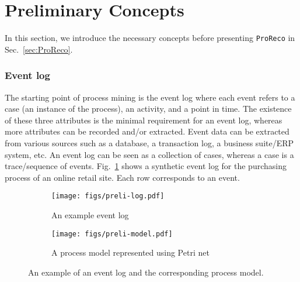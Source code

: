 \section{Preliminary Concepts}\label{sec:prel}
\vspace{-0.5em}
In this section, we introduce the necessary concepts before presenting \texttt{ProReco} in Sec.~\ref{sec:ProReco}. 

\subsubsection{Event log}
The starting point of process mining is the event log where each event refers to a case (an instance of the process), an activity, and a point in time. 
The existence of these three attributes is the minimal requirement for an event log, whereas more attributes can be recorded and/or extracted. 
Event data can be extracted from various sources such as a database, a transaction log, a business suite/ERP system, etc. 
An event log can be seen as a collection of cases, whereas a case is a trace/sequence of events. 
Fig.~\ref{fig:preli-log} shows a synthetic event log for the purchasing process of an online retail site. 
Each row corresponds to an event. 

\begin{figure}[h!]
    \centering
        \begin{subfigure}[b]{.33\linewidth}
            \texttt{[image: figs/preli-log.pdf]}
            \caption{An example event log}\label{fig:preli-log}
        \end{subfigure}
        \begin{subfigure}[b]{.65\linewidth}
            \texttt{[image: figs/preli-model.pdf]}
            \caption{A process model represented using Petri net}\label{fig:preli-model}
        \end{subfigure}
    \caption{An example of an event log and the corresponding process model.}
    \label{fig:preli-log-model}
    \vspace{-1.5em}
\end{figure}

